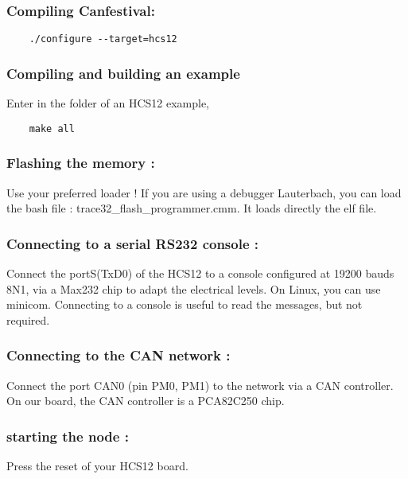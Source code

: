 \documentclass[12pt,english,a4paper]{book}
\begin{document}
\subsubsection{Compiling Canfestival:}

\begin{verbatim}
	./configure --target=hcs12
\end{verbatim}


\subsubsection{Compiling and building an example}

Enter in the folder of an HCS12 example,

\begin{verbatim}
	make all
\end{verbatim}


\subsubsection{Flashing the memory :}

Use your preferred loader ! If you are using a debugger Lauterbach,
you can load the bash file : trace32\_flash\_programmer.cmm. It loads
directly the elf file.


\subsubsection{Connecting to a serial RS232 console :}

Connect the portS(TxD0) of the HCS12 to a console configured at 19200
bauds 8N1, via a Max232 chip to adapt the electrical levels. On Linux,
you can use minicom. Connecting to a console is useful to read the
messages, but not required.


\subsubsection{Connecting to the CAN network :}

Connect the port CAN0 (pin PM0, PM1) to the network via a CAN controller.
On our board, the CAN controller is a PCA82C250 chip.


\subsubsection{starting the node :}

Press the reset of your HCS12 board.
\end{document}
